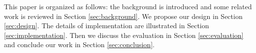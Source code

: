 This paper is organized as follows: the background is introduced and
some related work is reviewed in Section \ref{sec:background}. We propose
our design in Section \ref{sec:design}. The details of implementation
are illustrated in Section \ref{sec:implementation}. Then we discuss
the evaluation in Section \ref{sec:evaluation} and conclude our work
in Section \ref{sec:conclusion}.
\fi








